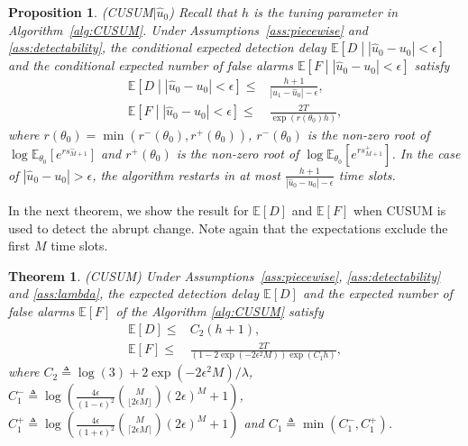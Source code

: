 \documentclass[letterpaper]{article} %
\newtheorem{theorem}{Theorem}
\newtheorem{proposition}{Proposition}
\newcommand{\blue}{}
\begin{document}
\begin{proposition}\label{prop:CUSUM}
\emph{(CUSUM$|\hat{u}_0$)}
Recall that $h$ is the tuning parameter in Algorithm~\ref{alg:CUSUM}.
Under Assumptions~\ref{ass:piecewise} and \ref{ass:detectability},
the conditional expected detection delay $\mathbb{E}\left[D\middle||\hat{u}_0-u_0|<\epsilon\right]$ and the conditional expected number of false alarms $\mathbb{E}\left[F\middle||\hat{u}_0-u_0|<\epsilon\right]$ satisfy
\begin{align}
\mathbb{E}\left[D\middle||\hat{u}_0-u_0|<\epsilon\right]\leq&\frac{h+1}{|u_1-\hat{u}_0|-\epsilon},\\
\mathbb{E}\left[F\middle||\hat{u}_0-u_0|<\epsilon\right]\leq&\frac{2T}{\exp(r(\theta_0)h)},
\end{align}
where $r(\theta_0)=\min(r^-(\theta_0),r^+(\theta_0))$, $r^-(\theta_0)$ is the non-zero root of $\log\mathbb{E}_{\theta_0}[e^{rs^-_{M+1}}]$ and $r^+(\theta_0)$ is the non-zero root of $\log\mathbb{E}_{\theta_0}[e^{rs^+_{M+1}}]$.
In the case of $|\hat{u}_0-u_0|>\epsilon$, the algorithm restarts in at most $\frac{h+1}{|\hat{u}_0-u_0|-\epsilon}$ time slots.
\end{proposition}


In the next theorem, we show the result for $\mathbb{E}[D]$ and
$\mathbb{E}[F]$ when CUSUM is used to detect the abrupt change. Note
again that the expectations exclude the first $M$ time slots.
\begin{theorem}\label{thm:CUSUM}
\emph{(CUSUM)} Under Assumptions~\ref{ass:piecewise}, \ref{ass:detectability} and \ref{ass:lambda}, the expected detection delay $\mathbb{E}[D]$ and the expected number of false alarms $\mathbb{E}[F]$ of the Algorithm \ref{alg:CUSUM} satisfy
\begin{align}
\mathbb{E}[D]\leq&{C_2(h+1)},\\
\mathbb{E}[F]\leq&\frac{2T}{(1-2\exp(-2\epsilon^2M))\exp(C_1h)},
\end{align}
where $C_2\triangleq\log(3)+2\exp(-2\epsilon^2M)/\lambda$, $C_1^-\triangleq\log\left(\frac{4\epsilon}{(1-\epsilon)^2}\binom{M}{\lfloor 2\epsilon M\rfloor}(2\epsilon)^M+1\right)$, $C_1^+\triangleq\log\left(\frac{4\epsilon}{(1+\epsilon)^2}\binom{M}{\lceil 2\epsilon M\rceil}(2\epsilon)^M+1\right)$ and $C_1\triangleq\min(C_1^-,C_1^+)$.
\end{theorem}
\end{document}
